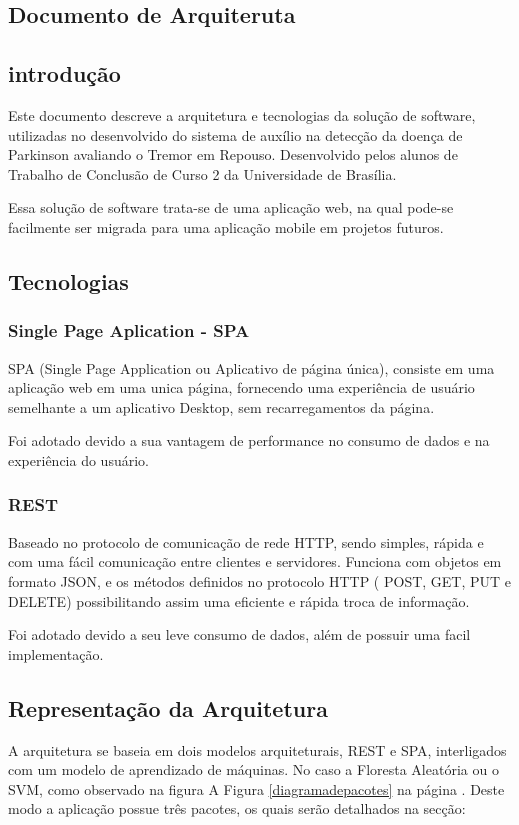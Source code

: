 \begin{anexosenv}

	\partanexos
	\chapter{Documento de Arquiteruta}
	\label{adoarquitetura}
	\section{introdução}
	Este documento descreve a arquitetura e tecnologias da solução de software, utilizadas no desenvolvido do sistema de auxílio na detecção da doença de Parkinson avaliando o Tremor em Repouso. Desenvolvido pelos alunos de Trabalho de Conclusão de Curso 2 da Universidade de Brasília.

	Essa solução de software trata-se de uma aplicação web, na qual pode-se facilmente ser migrada para uma aplicação mobile em projetos futuros.

	\section{Tecnologias}
	\subsection{Single Page Aplication - SPA}
	SPA (Single Page Application ou Aplicativo de página única), consiste em uma aplicação web em uma unica página, fornecendo uma experiência de usuário semelhante a um aplicativo Desktop, sem recarregamentos da página.

    Foi adotado devido a sua vantagem de performance no consumo de dados e na experiência do usuário.

	\subsection{REST}
	Baseado no protocolo de comunicação de rede HTTP, sendo simples, rápida e com uma fácil comunicação entre clientes e servidores. Funciona com objetos em formato JSON, e os métodos definidos no protocolo HTTP ( POST, GET, PUT e DELETE) possibilitando assim uma eficiente e rápida troca de informação.

    Foi adotado devido a seu leve consumo de dados, além de possuir uma facil implementação. 

	\section{Representação da Arquitetura}
	A arquitetura se baseia em dois modelos arquiteturais, REST e SPA, interligados com um modelo de aprendizado de máquinas. No caso a Floresta Aleatória ou o SVM, como observado na figura A Figura \ref{diagramadepacotes} na página \pageref{diagramadepacotes}. Deste modo a aplicação possue três pacotes, os quais serão detalhados na secção:


\end{anexosenv}
